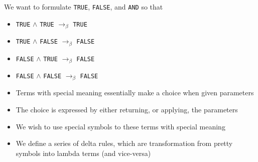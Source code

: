 \documentclass{beamer}
\begin{document}
\begin{frame}[fragile]{\CurrentSection}
\begin{exampleblock}{}
We want to formulate \texttt{TRUE}, \texttt{FALSE}, and \texttt{AND} so that
\end{exampleblock}

 
\begin{exampleblock}{}
\begin{itemize}
\item \texttt{TRUE} $\wedge$ \texttt{TRUE} $\rightarrow_\beta$ \texttt{TRUE}
\item \texttt{TRUE} $\wedge$ \texttt{FALSE} $\rightarrow_\beta$ \texttt{FALSE}
\item \texttt{FALSE} $\wedge$ \texttt{TRUE} $\rightarrow_\beta$ \texttt{FALSE}
\item \texttt{FALSE} $\wedge$ \texttt{FALSE} $\rightarrow_\beta$ \texttt{FALSE}

\end{itemize}

\end{exampleblock}

 

\end{frame}

\begin{frame}[fragile]{\CurrentSection}
\begin{block}{\CurrentSubSection}
\begin{itemize}
\item Terms with special meaning essentially make a choice when given parameters
\item The choice is expressed by either returning, or applying, the parameters

\end{itemize}

\end{block}


\end{frame}

\begin{frame}[fragile]{\CurrentSection}
\begin{block}{\CurrentSubSection}
\begin{itemize}
\item We wish to use special symbols to these terms with special meaning
\item We define a series of delta rules, which are transformation from pretty symbols into lambda terms (and vice-versa)

\end{itemize}

\end{block}


\end{frame}
\end{document}

